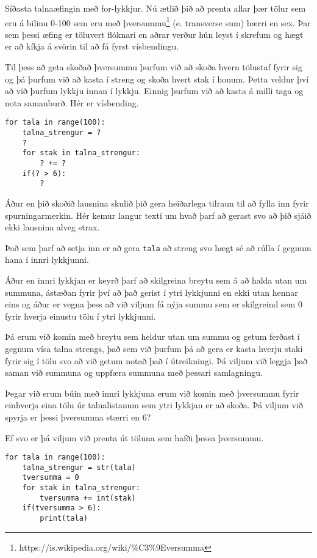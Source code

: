 \begin{exercise}\label{lyk4}
Síðasta talnaæfingin með for-lykkjur.
Nú ætlið þið að prenta allar þær tölur sem eru á bilinu 0-100 sem eru með þversummu\footnote{https://is.wikipedia.org/wiki/\%C3\%9Eversumma} (e. transverse sum) hærri en sex.
Þar sem þessi æfing er töluvert flóknari en aðrar verður hún leyst í skrefum og hægt er að kíkja á svörin til að fá fyrst vísbendingu.
\end{exercise}
\begin{Answer}[ref={lyk4}]
Til þess að geta skoðað þversummu þurfum við að skoða hvern tölustaf fyrir sig og þá þurfum við að kasta í streng og skoða hvert stak í honum.
Þetta veldur því að við þurfum lykkju innan í lykkju.
Einnig þurfum við að kasta á milli taga og nota samanburð.
Hér er vísbending.
\begin{lstlisting}
for tala in range(100):
	talna_strengur = ?
	?
	for stak in talna_strengur:
		? += ?
	if(? > 6):
		?
\end{lstlisting}

Áður en þið skoðið lausnina skulið þið gera heiðarlega tilraun til að fylla inn fyrir spurningarmerkin.
Hér kemur langur texti um hvað þarf að gerast svo að þið sjáið ekki lausnina alveg strax.

Það sem þarf að setja inn er að gera \texttt{tala} að streng svo hægt sé að rúlla í gegnum hana í innri lykkjunni.

Áður en innri lykkjan er keyrð þarf að skilgreina breytu sem á að halda utan um summuna, ástæðan fyrir því að það gerist í ytri lykkjunni en ekki utan hennar eins og áður er vegna þess að við viljum fá nýja summu sem er skilgreind sem 0 fyrir hverja einustu tölu í ytri lykkjunni.

Þá erum við komin með breytu sem heldur utan um summu og getum ferðast í gegnum vísa talna strengs, það sem við þurfum þá að gera er kasta hverju staki fyrir sig í tölu svo að við getum notað það í útreikningi.
Þá viljum við leggja það saman við summuna og uppfæra summuna með þessari samlagningu.

Þegar við erum búin með innri lykkjuna erum við komin með þversummu fyrir einhverja eina tölu úr talnalistanum sem ytri lykkjan er að skoða.
Þá viljum við spyrja er þessi þversumma stærri en 6?

Ef svo er þá viljum við prenta út töluna sem hafði þessa þversummu.

\begin{lstlisting}
for tala in range(100):
	talna_strengur = str(tala)
	tversumma = 0
	for stak in talna_strengur:
		tversumma += int(stak)
	if(tversumma > 6):
		print(tala)\end{lstlisting}
\end{Answer}

